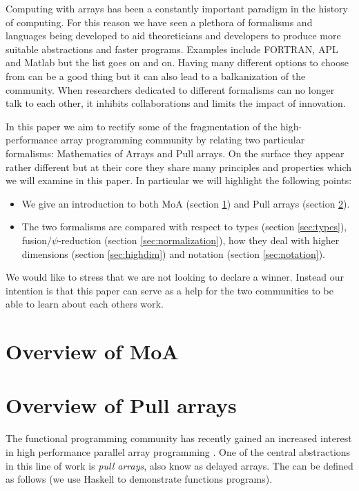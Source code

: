 \documentclass[preprint]{sigplanconf}
\begin{document}
Computing with arrays has been a constantly important paradigm in the
history of computing. For this reason we have seen a plethora of
formalisms and languages being developed to aid theoreticians and
developers to produce more suitable abstractions and faster programs.
Examples include FORTRAN, APL and Matlab but the list goes on and on.
Having many different options to choose from can be a good thing but
it can also lead to a balkanization of the community. When researchers
dedicated to different formalisms can no longer talk to each other,  it
inhibits collaborations and limits the impact of innovation.

In this paper we aim to rectify some of the fragmentation of the
high-performance array programming community by relating two
particular formalisms: Mathematics of Arrays and Pull arrays. On the
surface they appear rather different but at their core they share many
principles and properties which we will examine in this paper. In
particular we will highlight the following points:
\begin{itemize}
\item We give an introduction to both MoA (section \ref{sec:moa}) and Pull
  arrays (section \ref{sec:pull}).
\item The two formalisms are compared with respect to types (section
  \ref{sec:types}), fusion/\(\psi\)-reduction (section
  \ref{sec:normalization}), 
  how they deal with higher dimensions (section \ref{sec:highdim})
  and notation (section \ref{sec:notation}).
\end{itemize}

We would like to stress that we are not looking to declare a
winner. Instead our intention is that this paper can serve as a help
for the two communities to be able to learn about each others work.

\section{Overview of MoA}
\label{sec:moa}

\section{Overview of Pull arrays}
\label{sec:pull}

The functional programming community has recently gained an increased
interest in high performance parallel array programming
\cite{keller2010regular,Axelsson:2010:Feldspar,Mainland:2010:Nikola,Svensson:2011:Obsidian,Claessen:2012:Expressive,Ankner:2013:AnEDSL,lippmeier2011efficient}. One
of the central abstractions in this line of work is \emph{pull
 arrays}, also know as delayed arrays. The can be defined as follows
(we use Haskell \cite{marlow2010haskell} to demonstrate functions
programs).
\end{document}
